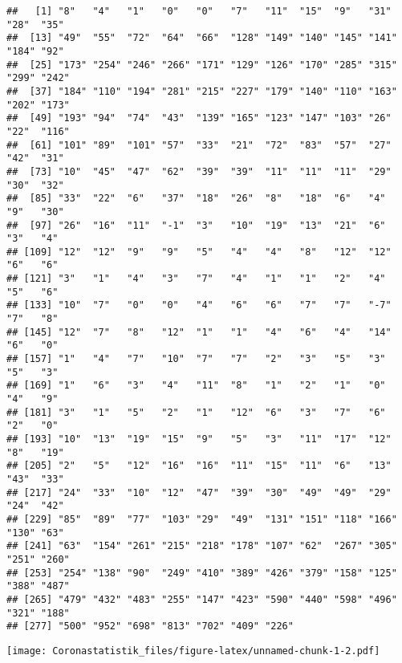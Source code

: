 \documentclass[
]{article}
\newenvironment{Shaded}{\begin{snugshade}}{\end{snugshade}}
\newcommand{\CommentTok}[1]{\textcolor[rgb]{0.56,0.35,0.01}{\textit{#1}}}
\newcommand{\DataTypeTok}[1]{\textcolor[rgb]{0.13,0.29,0.53}{#1}}
\newcommand{\DecValTok}[1]{\textcolor[rgb]{0.00,0.00,0.81}{#1}}
\newcommand{\KeywordTok}[1]{\textcolor[rgb]{0.13,0.29,0.53}{\textbf{#1}}}
\newcommand{\NormalTok}[1]{#1}
\newcommand{\OperatorTok}[1]{\textcolor[rgb]{0.81,0.36,0.00}{\textbf{#1}}}
\newcommand{\StringTok}[1]{\textcolor[rgb]{0.31,0.60,0.02}{#1}}
\begin{document}
\begin{verbatim}
##   [1] "8"   "4"   "1"   "0"   "0"   "7"   "11"  "15"  "9"   "31"  "28"  "35" 
##  [13] "49"  "55"  "72"  "64"  "66"  "128" "149" "140" "145" "141" "184" "92" 
##  [25] "173" "254" "246" "266" "171" "129" "126" "170" "285" "315" "299" "242"
##  [37] "184" "110" "194" "281" "215" "227" "179" "140" "110" "163" "202" "173"
##  [49] "193" "94"  "74"  "43"  "139" "165" "123" "147" "103" "26"  "22"  "116"
##  [61] "101" "89"  "101" "57"  "33"  "21"  "72"  "83"  "57"  "27"  "42"  "31" 
##  [73] "10"  "45"  "47"  "62"  "39"  "39"  "11"  "11"  "11"  "29"  "30"  "32" 
##  [85] "33"  "22"  "6"   "37"  "18"  "26"  "8"   "18"  "6"   "4"   "9"   "30" 
##  [97] "26"  "16"  "11"  "-1"  "3"   "10"  "19"  "13"  "21"  "6"   "3"   "4"  
## [109] "12"  "12"  "9"   "9"   "5"   "4"   "4"   "8"   "12"  "12"  "6"   "6"  
## [121] "3"   "1"   "4"   "3"   "7"   "4"   "1"   "1"   "2"   "4"   "5"   "6"  
## [133] "10"  "7"   "0"   "0"   "4"   "6"   "6"   "7"   "7"   "-7"  "7"   "8"  
## [145] "12"  "7"   "8"   "12"  "1"   "1"   "4"   "6"   "4"   "14"  "6"   "0"  
## [157] "1"   "4"   "7"   "10"  "7"   "7"   "2"   "3"   "5"   "3"   "5"   "3"  
## [169] "1"   "6"   "3"   "4"   "11"  "8"   "1"   "2"   "1"   "0"   "4"   "9"  
## [181] "3"   "1"   "5"   "2"   "1"   "12"  "6"   "3"   "7"   "6"   "2"   "0"  
## [193] "10"  "13"  "19"  "15"  "9"   "5"   "3"   "11"  "17"  "12"  "8"   "19" 
## [205] "2"   "5"   "12"  "16"  "16"  "11"  "15"  "11"  "6"   "13"  "43"  "33" 
## [217] "24"  "33"  "10"  "12"  "47"  "39"  "30"  "49"  "49"  "29"  "24"  "42" 
## [229] "85"  "89"  "77"  "103" "29"  "49"  "131" "151" "118" "166" "130" "63" 
## [241] "63"  "154" "261" "215" "218" "178" "107" "62"  "267" "305" "251" "260"
## [253] "254" "138" "90"  "249" "410" "389" "426" "379" "158" "125" "388" "487"
## [265] "479" "432" "483" "255" "147" "423" "590" "440" "598" "496" "321" "188"
## [277] "500" "952" "698" "813" "702" "409" "226"
\end{verbatim}

\begin{Shaded}
\end{Shaded}

\texttt{[image: Coronastatistik\_files/figure-latex/unnamed-chunk-1-2.pdf]}
\end{document}
